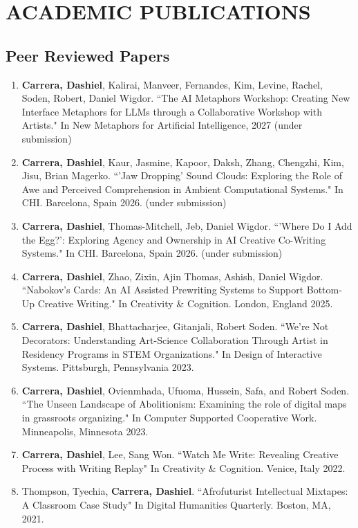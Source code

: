\section{ACADEMIC PUBLICATIONS}

\subsection{Peer Reviewed Papers}
 \begin{enumerate}
  
\item \textbf{Carrera, Dashiel}, Kalirai, Manveer, Fernandes, Kim, Levine, Rachel, Soden, Robert, Daniel Wigdor. ``The AI Metaphors Workshop: Creating New Interface Metaphors for LLMs through a Collaborative Workshop with Artists." In New Metaphors for Artificial Intelligence, 2027 (under submission) \\

 
   \item \textbf{Carrera, Dashiel}, Kaur, Jasmine, Kapoor, Daksh, Zhang, Chengzhi, Kim, Jisu, Brian Magerko. ``'Jaw Dropping' Sound Clouds: Exploring the Role of Awe and Perceived Comprehension in Ambient Computational Systems." In CHI. Barcelona, Spain 2026. (under submission) \\
 
  \item \textbf{Carrera, Dashiel}, Thomas-Mitchell, Jeb, Daniel Wigdor. ``'Where Do I Add the Egg?': Exploring Agency and Ownership in AI Creative Co-Writing Systems." In CHI. Barcelona, Spain 2026. (under submission) \\
  
   
  \item \textbf{Carrera, Dashiel}, Zhao, Zixin, Ajin Thomas, Ashish, Daniel Wigdor. ``Nabokov's Cards: An AI Assisted Prewriting Systems to Support Bottom-Up Creative Writing." In Creativity \& Cognition. London, England 2025. \\
  \item \textbf{Carrera, Dashiel}, Bhattacharjee, Gitanjali, Robert Soden. ``We're Not Decorators: Understanding Art-Science Collaboration Through Artist in Residency Programs in STEM Organizations." In Design of Interactive Systems. Pittsburgh, Pennsylvania 2023. \\
  \item \textbf{Carrera, Dashiel}, Ovienmhada, Ufuoma, Hussein, Safa, and Robert Soden. ``The Unseen Landscape of Abolitionism: Examining the role of digital maps in
grassroots organizing."  In Computer Supported Cooperative Work. Minneapolis, Minnesota 2023.\\
  \item \textbf{Carrera, Dashiel}, Lee, Sang Won. ``Watch Me Write: Revealing Creative Process with Writing Replay" In Creativity \& Cognition. Venice, Italy 2022. \\
  \item Thompson, Tyechia, \textbf{Carrera, Dashiel}. ``Afrofuturist Intellectual Mixtapes: A Classroom Case Study" In Digital Humanities Quarterly. Boston, MA, 2021.\
 \end{enumerate}

